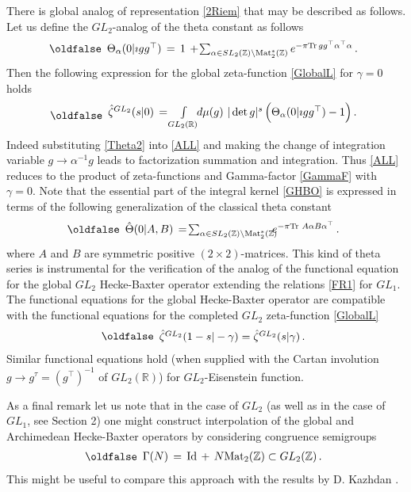 \documentclass[12pt]{article}
\def\IR{\mathbb{R}}
\def\IZ{\mathbb{Z}}
\def\a {{\alpha}}
\def\Id{{\rm Id}}
\def\Mat{{\rm Mat}}
\def\Tr{{\rm Tr}\,}
\def\be{\begin{eqnarray}\new\begin{array}{cc}}
\def\ee{\end{array}\end{eqnarray}}
\newcounter{pac}[section]
\begin{document}
There is global analog of representation \eqref{2Riem} that may be
described as follows. Let us define  the $GL_2$-analog of the  theta
constant as follows
 \be\label{Theta2}
  \Theta_{\alpha}(0|\imath gg^{\top})\,
  =\,1\,+\!\sum_{\alpha \in  SL_2(\IZ)\backslash {\rm
    Mat}_2^*(\IZ)}
    e^{-\pi\Tr  gg^\top \alpha^\top\alpha}\,.
 \ee
Then the following expression for the global zeta-function \eqref{GlobalL}
 for $\gamma=0$  holds
 \be\label{ALL}
  \hat{\zeta}^{GL_2}(s|0)\,=\!\int\limits_{GL_2(\IR)}\!\! d\mu(g)\,\,|\det g|^s\,
  \Big(\Theta_{\alpha}(0|\imath gg^{\top})-1\Big)\,.
 \ee
Indeed substituting  \eqref{Theta2} into \eqref{ALL} and making the
change of integration variable $g\to \alpha^{-1}g$ leads to
factorization summation and integration. Thus  \eqref{ALL} reduces to the product of
zeta-functions and Gamma-factor \eqref{GammaF} with $\gamma=0$. Note
that the essential part of the integral kernel \eqref{GHBO} is
expressed in terms of the following generalization of the classical theta
constant
 \be
  \hat{\Theta}(0|A,B)\,
  =\!\sum_{\a\in SL_2(\IZ)\backslash {\rm
      Mat}^*_2(\IZ)}\!\!\!\!e^{-\pi\Tr\,A\alpha
    B\alpha^{\top}}\,.
 \ee
where $A$ and $B$ are symmetric positive $(2\times 2)$-matrices. This
kind of theta series is instrumental for the verification
of the analog of the functional equation for the global $GL_2$
Hecke-Baxter operator extending the relations \eqref{FR1} for $GL_1$.
The functional equations for the global Hecke-Baxter operator are
compatible with the  functional equations for the completed  $GL_2$ zeta-function
\eqref{GlobalL}
\be
\hat{\zeta}^{GL_2}(1-s|-\gamma)=\hat{\zeta}^{GL_2}(s|\gamma)\,.
\ee
Similar functional equations hold (when supplied with the Cartan
involution $g\to g^{\tau}=(g^{\top})^{-1}$ of $GL_2(\IR)$) for
$GL_2$-Eisenstein function.

As a final remark let us  note that in the case of $GL_2$ (as well
as in the case of $GL_1$, see  Section 2) one might construct
interpolation of the global and Archimedean Hecke-Baxter operators
by considering congruence semigroups
 \be
  \Gamma(N)\,
  =\,\Id\,+\,N\Mat_2(\IZ)\subset GL_2(\IZ)\,.
 \ee
This might be useful to compare this approach with the results by D.
Kazhdan  \cite{Kaj}.






\vspace{5mm}
\end{document}
